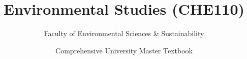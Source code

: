 \documentclass[a4paper,11pt,oneside,openany]{book}
\title{Environmental Studies (CHE110)}
\author{Faculty of Environmental Sciences \& Sustainability}
\date{Comprehensive University Master Textbook}
\begin{document}
\frontmatter

\makebookcover
\copyrightpage
\disclaimerpage

\tableofcontents
\newpage

\mainmatter







\end{document}
